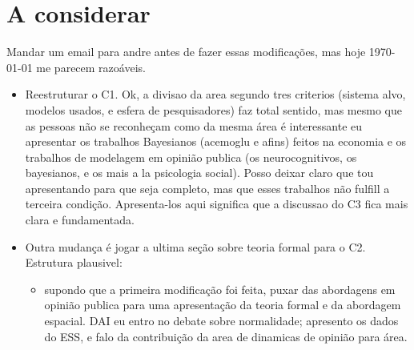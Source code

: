 \documentclass{article}
\begin{document}
\section*{A considerar}

Mandar um email para andre antes de fazer essas modificações, mas hoje \today
\hspace{0.1cm} me parecem razoáveis.

\begin{itemize}
\item Reestruturar o C1. Ok, a divisao da area segundo tres criterios (sistema
  alvo, modelos usados, e esfera de pesquisadores) faz total sentido, mas mesmo
  que as pessoas não se reconheçam como da mesma área é interessante eu
  apresentar os trabalhos Bayesianos (acemoglu e afins) feitos na economia e os trabalhos de
  modelagem em opinião publica (os neurocognitivos, os bayesianos, e os mais a
  la psicologia social). Posso deixar claro que tou apresentando para que seja
  completo, mas que esses trabalhos não fulfill a terceira condição.
  Apresenta-los aqui significa que a discussao do C3 fica mais clara e
  fundamentada.
\item Outra mudança é jogar a ultima seção sobre teoria formal para o C2.
  Estrutura plausivel:
  \begin{itemize}
  \item supondo que a primeira modificação foi feita, puxar das abordagens em
    opinião publica para uma apresentação da teoria formal e da abordagem
    espacial. DAI eu entro no debate sobre normalidade; apresento os dados do
    ESS, e falo da contribuição da area de dinamicas de opinião para área. 
  \end{itemize}

\end{itemize}
\end{document}
